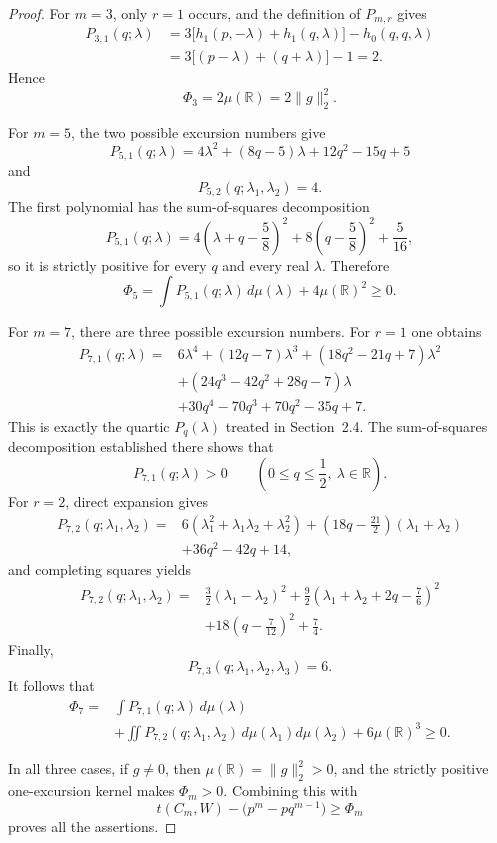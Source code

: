 \documentclass[11pt]{article}
\begin{document}
\begin{proof}
For $m=3$, only $r=1$ occurs, and the definition of $P_{m,r}$ gives
\[
 \begin{aligned}
 P_{3,1}(q;\lambda)
 &=3\bigl[h_1(p,-\lambda)+h_1(q,\lambda)\bigr]-h_0(q,q,\lambda)\\
 &=3\bigl[(p-\lambda)+(q+\lambda)\bigr]-1=2.
 \end{aligned}
\]
Hence
\[
 \Phi_3=2\mu(\mathbb R)=2\lVert g\rVert_2^2.
\]

For $m=5$, the two possible excursion numbers give
\[
 P_{5,1}(q;\lambda)
 =4\lambda^2+(8q-5)\lambda+12q^2-15q+5
\]
and
\[
 P_{5,2}(q;\lambda_1,\lambda_2)=4.
\]
The first polynomial has the sum-of-squares decomposition
\[
 P_{5,1}(q;\lambda)
 =4\left(\lambda+q-\frac58\right)^2
  +8\left(q-\frac58\right)^2+\frac5{16},
\]
so it is strictly positive for every $q$ and every real $\lambda$.  Therefore
\[
 \Phi_5
 =\int P_{5,1}(q;\lambda)\,d\mu(\lambda)
  +4\mu(\mathbb R)^2
 \ge 0.
\]

For $m=7$, there are three possible excursion numbers.  For $r=1$ one
obtains
\[
 \begin{aligned}
 P_{7,1}(q;\lambda)={}&
 6\lambda^4+(12q-7)\lambda^3
 +(18q^2-21q+7)\lambda^2\\
 &+(24q^3-42q^2+28q-7)\lambda\\
 &+30q^4-70q^3+70q^2-35q+7.
 \end{aligned}
\]
This is exactly the quartic $P_q(\lambda)$ treated in Section~2.4.  The
sum-of-squares decomposition established there shows that
\[
 P_{7,1}(q;\lambda)>0
 \qquad
 \left(0\le q\le\frac12,\ \lambda\in\mathbb R\right).
\]
For $r=2$, direct expansion gives
\[
 \begin{aligned}
 P_{7,2}(q;\lambda_1,\lambda_2)={}&
 6(\lambda_1^2+\lambda_1\lambda_2+\lambda_2^2)
 +\left(18q-\frac{21}{2}\right)(\lambda_1+\lambda_2)\\
 &+36q^2-42q+14,
 \end{aligned}
\]
and completing squares yields
\[
 \begin{aligned}
 P_{7,2}(q;\lambda_1,\lambda_2)={}&
 \frac32(\lambda_1-\lambda_2)^2
 +\frac92\left(\lambda_1+\lambda_2+2q-\frac76\right)^2\\
 &+18\left(q-\frac7{12}\right)^2+\frac74.
 \end{aligned}
\]
Finally,
\[
 P_{7,3}(q;\lambda_1,\lambda_2,\lambda_3)=6.
\]
It follows that
\[
 \begin{aligned}
 \Phi_7={}&
 \int P_{7,1}(q;\lambda)\,d\mu(\lambda)\\
 &+\iint P_{7,2}(q;\lambda_1,\lambda_2)
 \,d\mu(\lambda_1)d\mu(\lambda_2)
 +6\mu(\mathbb R)^3
 \ge 0.
 \end{aligned}
\]

In all three cases, if $g\ne0$, then $\mu(\mathbb R)=\lVert g\rVert_2^2>0$,
and the strictly positive one-excursion kernel makes $\Phi_m>0$.
Combining this with
\[
 t(C_m,W)-\bigl(p^m-pq^{m-1}\bigr)\ge \Phi_m
\]
proves all the assertions.
\end{proof}
\end{document}
